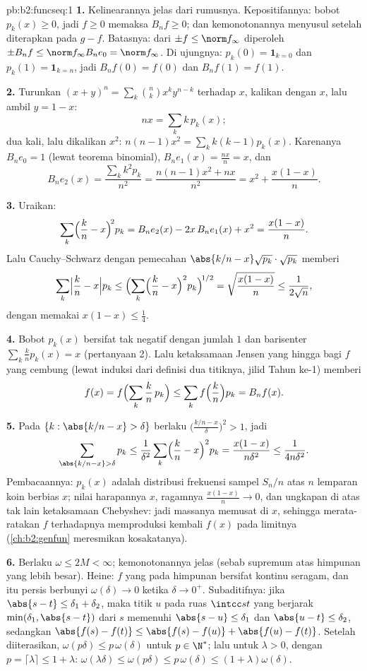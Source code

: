 \begin{solution}{pb:b2:funcseq:1}
\textbf{1.} Kelinearannya jelas dari rumusnya. Kepositifannya:
bobot $p_k(x) \geq 0$, jadi $f \geq 0$ memaksa $B_nf \geq
0$; dan kemonotonannya menyusul setelah diterapkan pada $g - f$.
Batasnya: dari $\pm f \leq \norm f_\infty$ diperoleh $\pm B_nf \leq
\norm f_\infty B_ne_0 = \norm f_\infty$. Di ujungnya: $p_k(0) =
\mathbf 1_{k=0}$ dan $p_k(1) = \mathbf 1_{k=n}$, jadi $B_nf(0) = f(0)$
dan $B_nf(1) = f(1)$.

\textbf{2.} Turunkan $(x+y)^n = \sum_k\binom nk x^ky^{n-k}$
terhadap $x$, kalikan dengan $x$, lalu ambil $y = 1 - x$:
\[
nx = \sum_k k\,p_k(x) ;
\]
dua kali, lalu dikalikan $x^2$: $n(n-1)x^2 = \sum_k k(k-1)p_k(x)$.
Karenanya $B_ne_0 = 1$ (lewat teorema binomial), $B_ne_1(x) =
\frac{nx}{n} = x$, dan
\[
B_ne_2(x) = \frac{\sum_k k^2p_k}{n^2}
= \frac{n(n-1)x^2 + nx}{n^2}
= x^2 + \frac{x(1-x)}{n} .
\]

\textbf{3.} Uraikan:
\[
\sum_k\Bigl(\frac kn - x\Bigr)^{\!2} p_k
= B_ne_2(x) - 2x\,B_ne_1(x) + x^2
= \frac{x(1-x)}{n} .
\]
Lalu Cauchy--Schwarz dengan pemecahan $\abs{k/n - x}\sqrt{p_k}
\cdot \sqrt{p_k}$ memberi
\[
\sum_k\Bigl|\frac kn - x\Bigr| p_k
\leq \Bigl(\sum_k\Bigl(\frac kn - x\Bigr)^2
p_k\Bigr)^{\!1/2}
= \sqrt{\frac{x(1-x)}{n}} \leq \frac{1}{2\sqrt n},
\]
dengan memakai $x(1-x) \leq \frac14$.

\textbf{4.} Bobot $p_k(x)$ bersifat tak negatif dengan jumlah $1$
dan barisenter $\sum_k \frac kn p_k(x) = x$ (pertanyaan 2). Lalu
ketaksamaan Jensen yang hingga bagi $f$ yang cembung (lewat induksi dari
definisi dua titiknya, jilid Tahun ke-1) memberi
\[
f(x) = f\Bigl(\sum_k \frac kn\,p_k\Bigr)
\leq \sum_k f\Bigl(\frac kn\Bigr)p_k = B_nf(x) .
\]

\textbf{5.} Pada $\{k : \abs{k/n - x} > \delta\}$ berlaku
$\bigl(\frac{k/n - x}{\delta}\bigr)^2 > 1$, jadi
\[
\sum_{\abs{k/n-x}>\delta} p_k
\leq \frac{1}{\delta^2}\sum_k\Bigl(\frac kn -
x\Bigr)^2p_k
= \frac{x(1-x)}{n\delta^2} \leq \frac{1}{4n\delta^2} .
\]
Pembacaannya: $p_k(x)$ adalah distribusi frekuensi sampel $S_n/n$ atas
$n$ lemparan koin berbias $x$; nilai harapannya $x$, ragamnya
$\frac{x(1-x)}n \to 0$, dan ungkapan di atas tak lain ketaksamaan
Chebyshev: jadi massanya memusat di $x$, sehingga merata-ratakan $f$
terhadapnya memproduksi kembali $f(x)$ pada limitnya
(\cref{ch:b2:genfun} meresmikan kosakatanya).

\textbf{6.} Berlaku $\omega \leq 2M < \infty$; kemonotonannya jelas
(sebab supremum atas himpunan yang lebih besar). Heine: $f$ yang 
pada himpunan  bersifat kontinu seragam, dan itu persis berbunyi
$\omega(\delta) \to 0$ ketika $\delta \to 0^+$. Subaditifnya: jika
$\abs{s - t} \leq \delta_1 + \delta_2$, maka titik $u$ pada ruas
$\intcc st$ yang berjarak $\min(\delta_1, \abs{s-t})$ dari $s$ memenuhi
$\abs{s-u} \leq \delta_1$ dan $\abs{u-t} \leq \delta_2$, sedangkan
$\abs{f(s)-f(t)} \leq \abs{f(s)-f(u)} + \abs{f(u)-f(t)}$.
Setelah diiterasikan, $\omega(p\delta) \leq p\,\omega(\delta)$ untuk $p
\in \N^*$; lalu untuk $\lambda > 0$, dengan $p = \lceil\lambda\rceil
\leq 1 + \lambda$: $\omega(\lambda\delta) \leq \omega(p\delta) \leq
p\,\omega(\delta) \leq (1+\lambda)\omega(\delta)$.


\end{solution}
